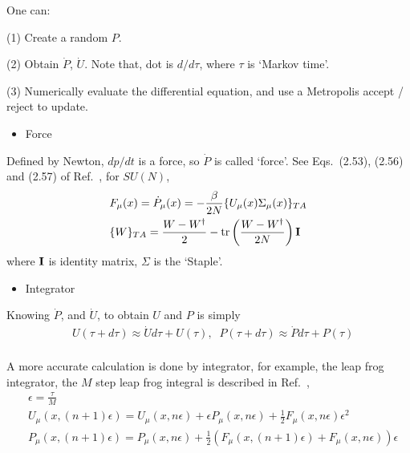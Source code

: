 One can:

(1) Create a random $P$.

(2) Obtain $\dot{P}$, $\dot{U}$. Note that, dot is $d/d\tau$, where $\tau$ is `Markov time'.

(3) Numerically evaluate the differential equation, and use a Metropolis accept / reject to update.

\begin{itemize}
\item {}Force
\end{itemize}

Defined by Newton, $dp/dt$ is a force, so $\dot{P}$ is called `force'. See Eqs.~(2.53), (2.56) and (2.57) of Ref.~\cite{latticeqcdbook2017}, for $SU(N)$,
\begin{equation}
\begin{split}
&F_{\mu}(x)=\dot{P}_{\mu}(x)=-\frac{\beta}{2N}\{U_{\mu}(x)\Sigma _{\mu}(x)\}_{TA}\\
&\{W\}_{TA}=\frac{W-W^{\dagger}}{2}-{\rm tr}\left(\frac{W-W^{\dagger}}{2N}\right){\bf I}\\
\end{split}
\label{eq.hmc.force}
\end{equation}
where ${\bf I}$ is identity matrix, $\Sigma$ is the `Staple'.

\begin{itemize}
\item {}Integrator
\end{itemize}

Knowing $\dot{P}$, and $\dot {U}$, to obtain $U$ and $P$ is simply
\begin{equation}
\begin{split}
&U(\tau+d\tau)\approx \dot{U}d\tau + U(\tau),\;\;P(\tau+d\tau)\approx \dot{P}d\tau + P(\tau)\\
\end{split}
\end{equation}

A more accurate calculation is done by integrator, for example, the leap frog integrator, the $M$ step leap frog integral is described in Ref.~\cite{latticeqcdbook2010},
\begin{subequations}
\begin{eqnarray}
&\epsilon = \frac{\tau}{M}\\
&U_{\mu}(x,(n+1)\epsilon)=U_{\mu}(x,n\epsilon)+\epsilon P_{\mu}(x,n\epsilon)+\frac{1}{2}F_{\mu}(x,n\epsilon)\epsilon ^2\\
&P_{\mu}(x,(n+1)\epsilon)=P_{\mu}(x,n\epsilon)+\frac{1}{2}\left(F_{\mu}(x,(n+1)\epsilon)+F_{\mu}(x,n\epsilon)\right)\epsilon
\end{eqnarray}
\label{eq.hmc.update_basic}
\end{subequations}

